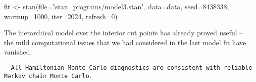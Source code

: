 \documentclass[
  letterpaper,
  DIV=11,
  numbers=noendperiod]{scrartcl}
\newenvironment{Shaded}{\begin{snugshade}}{\end{snugshade}}
\newcommand{\AttributeTok}[1]{\textcolor[rgb]{0.40,0.45,0.13}{#1}}
\newcommand{\ConstantTok}[1]{\textcolor[rgb]{0.56,0.35,0.01}{#1}}
\newcommand{\DecValTok}[1]{\textcolor[rgb]{0.68,0.00,0.00}{#1}}
\newcommand{\FunctionTok}[1]{\textcolor[rgb]{0.28,0.35,0.67}{#1}}
\newcommand{\NormalTok}[1]{\textcolor[rgb]{0.00,0.23,0.31}{#1}}
\newcommand{\OtherTok}[1]{\textcolor[rgb]{0.00,0.23,0.31}{#1}}
\newcommand{\SpecialCharTok}[1]{\textcolor[rgb]{0.37,0.37,0.37}{#1}}
\newcommand{\StringTok}[1]{\textcolor[rgb]{0.13,0.47,0.30}{#1}}
\begin{document}
\begin{Shaded}
\begin{Highlighting}[]
\NormalTok{fit }\OtherTok{\textless{}{-}} \FunctionTok{stan}\NormalTok{(}\AttributeTok{file=}\StringTok{"stan\_programs/model3.stan"}\NormalTok{,}
            \AttributeTok{data=}\NormalTok{data, }\AttributeTok{seed=}\DecValTok{8438338}\NormalTok{,}
            \AttributeTok{warmup=}\DecValTok{1000}\NormalTok{, }\AttributeTok{iter=}\DecValTok{2024}\NormalTok{, }\AttributeTok{refresh=}\DecValTok{0}\NormalTok{)}
\end{Highlighting}
\end{Shaded}

The hierarchical model over the interior cut points has already proved
useful -- the mild computational issues that we had considered in the
last model fit have vanished.

\begin{Shaded}
\end{Shaded}

\begin{verbatim}
  All Hamiltonian Monte Carlo diagnostics are consistent with reliable
Markov chain Monte Carlo.
\end{verbatim}

\begin{Shaded}
\end{Shaded}
\end{document}
